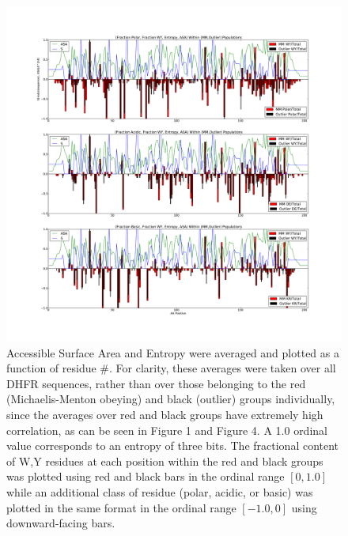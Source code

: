 \documentclass[a4paper,11pt]{article}
\begin{document}
\begin{figure}[a]
\centerline{\includegraphics[width=8in]{AA+S+ASA.pdf}}
\caption[$S_{\rm all}$, $ASA_{\rm all}$, WY/Polar/Acidic/Basic Content vs Residue \#]{Accessible Surface Area and Entropy were averaged and plotted as a function of residue \#. For clarity, these averages were taken over all DHFR sequences, rather than over those belonging to the red (Michaelis-Menton obeying) and black (outlier) groups individually, since the averages over red and black groups have extremely high correlation, as can be seen in Figure 1 and Figure 4. A 1.0 ordinal value corresponds to an entropy of three bits. The fractional content of W,Y residues at each position within the red and black groups was plotted using red and black bars in the ordinal range $[0,1.0]$ while an additional class of residue (polar, acidic, or basic) was plotted in the same format in the ordinal range $[-1.0,0]$ using downward-facing bars.}
\end{figure}
\end{document}
